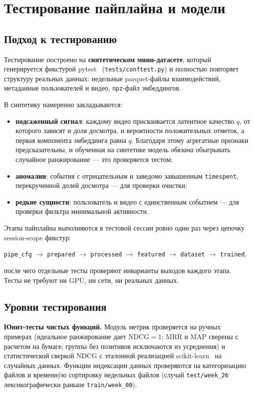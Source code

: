 \section{Тестирование пайплайна и модели}

\subsection{Подход к тестированию}

Тестирование построено на \textbf{синтетическом мини-датасете}, который генерируется фикстурой pytest~\cite{pytest-docs} (\texttt{tests/conftest.py}) и полностью повторяет структуру реальных данных: недельные parquet-файлы взаимодействий, метаданные пользователей и видео, \texttt{npz}-файл эмбеддингов.

В синтетику намеренно закладываются:
\begin{itemize}
    \item \textbf{подсаженный сигнал}: каждому видео присваивается латентное качество $q$, от которого зависят и доля досмотра, и вероятности положительных отметок, а первая компонента эмбеддинга равна $q$.
    Благодаря этому агрегатные признаки предсказательны, и обученная на синтетике модель \emph{обязана} обыгрывать случайное ранжирование --- это проверяется тестом;
    \item \textbf{аномалии}: события с отрицательным и заведомо завышенным \texttt{timespent}, перекрученной долей досмотра --- для проверки очистки;
    \item \textbf{редкие сущности}: пользователь и видео с единственным событием --- для проверки фильтра минимальной активности.
\end{itemize}

Этапы пайплайна выполняются в тестовой сессии ровно один раз через цепочку session-scope фикстур:
\begin{center}
\texttt{pipe\_cfg} $\rightarrow$ \texttt{prepared} $\rightarrow$ \texttt{processed} $\rightarrow$ \texttt{featured} $\rightarrow$ \texttt{dataset} $\rightarrow$ \texttt{trained},
\end{center}
после чего отдельные тесты проверяют инварианты выходов каждого этапа.
Тесты не требуют ни GPU, ни сети, ни реальных данных.

\subsection{Уровни тестирования}

\textbf{Юнит-тесты чистых функций.}
Модуль метрик проверяется на ручных примерах (идеальное ранжирование дает $\text{NDCG}=1$; MRR и MAP сверены с расчетом на бумаге; группы без позитивов исключаются из усреднения) и статистической сверкой NDCG с эталонной реализацией scikit-learn~\cite{sklearn-docs} на случайных данных.
Функции индексации данных проверяются на категоризацию файлов и временнýю сортировку недельных файлов (случай \texttt{test/week\_26} лексикографически раньше \texttt{train/week\_00}).

